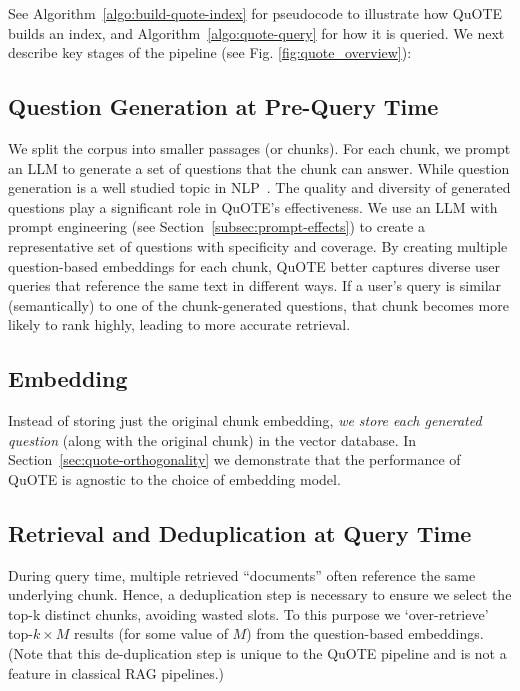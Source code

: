 See Algorithm~\ref{algo:build-quote-index} for pseudocode to illustrate how QuOTE builds an index, 
and 
Algorithm~\ref{algo:quote-query}
for how it is queried.
We next describe key stages of the pipeline (see Fig. \ref{fig:quote_overview}):

\subsection{Question Generation at Pre-Query Time}
We split the corpus into smaller passages (or chunks). For each
chunk, we prompt an LLM to generate a set of questions that the chunk can answer. While question generation is a well studied topic in NLP~\cite{heilman_smith_2009, qgen2, heilman_smith_2010}. 
The quality and diversity of generated questions play a significant role in QuOTE’s effectiveness. We use an LLM with
prompt engineering (see Section~\ref{subsec:prompt-effects}) to create a representative set of questions with specificity and coverage. By creating multiple question-based embeddings for each chunk, QuOTE better captures diverse user queries that reference the same text in different ways. 
If a user’s query is similar (semantically) to one of the chunk-generated questions, that chunk becomes more likely to rank highly, 
leading to more accurate retrieval.


\subsection{Embedding}
 Instead of storing just the original chunk embedding, \emph{we store each generated question} (along with the original chunk) in the vector database. 
 In Section~\ref{sec:quote-orthogonality} we demonstrate that the performance
 of QuOTE is agnostic to the
 choice of embedding model.

 \subsection{Retrieval and Deduplication at Query Time}
 During query time, multiple retrieved
``documents'' often reference the same underlying chunk. Hence,
a deduplication step is necessary to ensure we select the top-k distinct chunks, avoiding wasted slots.
To this purpose we `over-retrieve'
top-$k \times M$ results (for some value of $M$) from the question-based embeddings. 
(Note that this de-duplication step is unique to the QuOTE pipeline and is not a feature in classical RAG pipelines.)



